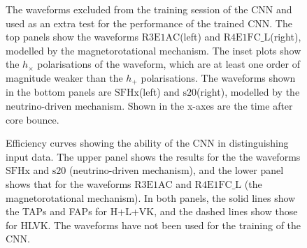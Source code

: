 \documentclass[aps,twocolumn,showpacs,groupedaddress, nofootinbib]{revtex4}  %
\begin{document}
\begin{figure}
\begin{center}
{        }
    \end{center}
    \caption{The waveforms excluded from the training session of the \ac{CNN}
and used as an extra test for the performance of the trained \ac{CNN}. The top 
panels show the waveforms $\text{R3E1AC}$(left) and $\text{R4E1FC\_L}$(right), 
modelled by the magnetorotational mechanism.
The inset plots show the $h_{\times}$ polarisations of the waveform, which are at least one order of magnitude weaker than the 
$h_{+}$ polarisations.
The waveforms shown in the bottom panels are $\text{SFHx}$(left) and $\text{s}20$(right), 
modelled by the neutrino-driven mechanism. 
Shown in the x-axes are the time after core bounce.\label{fig:Extratestwaveform}} 
\end{figure}
%
% 
%
\begin{figure}
     \begin{center}
        \quad
    \end{center}
    \caption{Efficiency curves showing the ability of the \ac{CNN} in
distinguishing input data.  The upper panel shows the results for the the
waveforms $\text{SFHx}$ and $\text{s}20$ (neutrino-driven mechanism), and the
lower panel shows that for the waveforms $\text{R3E1AC}$ and $\text{R4E1FC\_L}$
(the magnetorotational mechanism).  In both panels, the solid lines show the
\acp{TAP} and \acp{FAP} for H+L+VK, and the dashed lines show those for HLVK.
The waveforms have not been used for the training of the \ac{CNN}.
\label{fig:Extratest}}
\end{figure}
\end{document}
